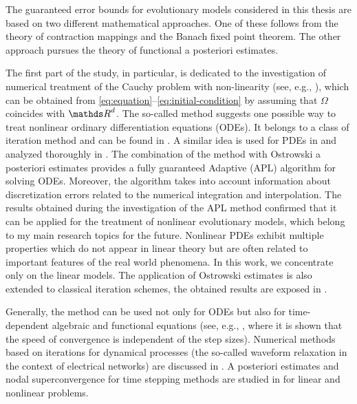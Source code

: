 
The guaranteed error bounds for evolutionary models considered in this thesis are based 
on two different mathematical approaches. One of these follows from the theory of 
contraction mappings and the Banach fixed point theorem. The other approach pursues
the theory of functional a posteriori estimates.

The first part of the study, in particular, is dedicated to the investigation of 
numerical treatment of the Cauchy problem with non-linearity  (see, e.g., 
\cite{CoddingtonLevinson1972, Haireretall1993, Teschl2012}), 
which can be obtained from 
\eqref{eq:equation}--\eqref{eq:initial-condition} by assuming that $\Omega$ 
coincides with $\Rd$. The so-called \PL method suggests 
one possible way to treat nonlinear ordinary differentiation 
equations (ODEs). 
It belongs to a class of iteration method and can 
be found in \cite{Liouville1838, Peano1888, Bendixson1893, Lindelof1894, 
Picard1890}. A similar idea is used for PDEs in \cite{Picard1890} and analyzed 
thoroughly in \cite[Vol.II]{Picard18911996}. 
The combination of the \PL method with Ostrowski a posteriori estimates provides a
fully guaranteed Adaptive \PL (APL) algorithm for solving ODEs. 
Moreover, the algorithm takes into account information about
discretization errors related to the numerical integration and interpolation.
The results obtained during the investigation of the APL method 
confirmed that it can be applied for the treatment of nonlinear 
evolutionary models, which belong to my main research topics for the future. 
Nonlinear PDEs exhibit multiple properties which do not 
appear in linear theory but are often related to important features of the real
world phenomena. In this work, we concentrate only on the linear 
models. The application of Ostrowski 
estimates is also extended to classical iteration schemes, the obtained results 
are exposed in \cite[Section 6.7]{Malietall2014}.

Generally, the \PL method can be used not only for ODEs but also for time-dependent 
algebraic and functional equations (see, e.g., 
\cite{NevanlinnaPI1989, NevanlinnaPII1989}, where it is shown that the speed of
convergence is independent of the step sizes). Numerical methods based on \PL 
iterations for dynamical processes (the so-called waveform relaxation in the context 
of electrical networks) are discussed in \cite{Erolaetall1995}. 
A posteriori estimates and nodal superconvergence for time
stepping methods are studied in \cite{Akrivisetall2011,MakridakisNochetto2006} for
linear and nonlinear problems.

